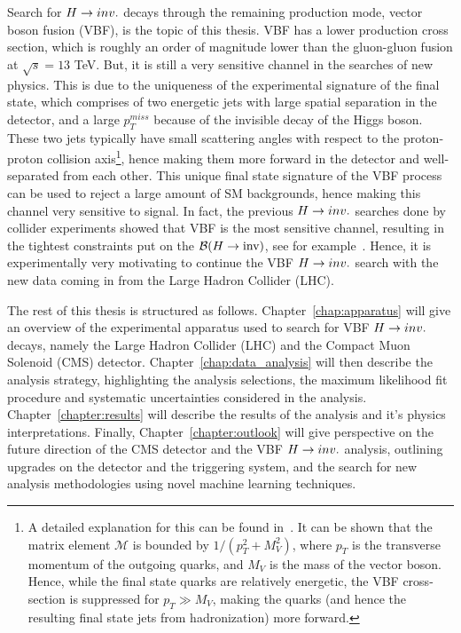 Search for $H \rightarrow inv.$ decays through the remaining production mode, vector boson fusion (VBF), is the topic of this thesis.
VBF has a lower production cross section, which is roughly an order of magnitude lower than the gluon-gluon fusion at $\sqrt{s} = 13$ TeV. But, it is still
a very sensitive channel in the searches of new physics. This is due to the uniqueness of the experimental signature of the final state, which comprises of two energetic jets with large
spatial separation in the detector, and a large $p_T^{miss}$ because of the invisible decay of the Higgs boson. These two jets typically have small scattering angles with respect to the proton-proton
collision axis\footnote{A detailed explanation for this can be found in~\cite{Djouadi:2005gi}. It can be shown that the matrix element $\mathcal{M}$ is bounded by $1 / (p_T^2 + M_V^2)$,
where $p_T$ is the transverse momentum of the outgoing quarks, and $M_V$ is the mass of the vector boson. Hence, while the final state quarks are relatively energetic, the VBF cross-section is
suppressed for $p_{T} \gg M_{V}$, making the quarks (and hence the resulting final state jets from hadronization) more forward.}, 
hence making them more forward in the detector and well-separated from each other. This unique final state signature of the VBF process can be used to reject a large amount of
SM backgrounds, hence making this channel very sensitive to signal. In fact, the previous $H \rightarrow inv.$ searches done by collider experiments showed that VBF is the most sensitive channel, resulting
in the tightest constraints put on the ${\mathcal{B}(H\rightarrow\text{inv})}$, see for example~\cite{CMS:2018yfx}. Hence, it is experimentally very motivating to continue the VBF $H \rightarrow inv.$ search with the new data coming in from
the Large Hadron Collider (LHC).

The rest of this thesis is structured as follows. Chapter~\ref{chap:apparatus} will give an overview of the experimental apparatus used to search for VBF $H \rightarrow inv.$ decays, namely the Large
Hadron Collider (LHC) and the Compact Muon Solenoid (CMS) detector. Chapter~\ref{chap:data_analysis} will then describe the analysis strategy, highlighting the analysis selections, the maximum
likelihood fit procedure and systematic uncertainties considered in the analysis. Chapter~\ref{chapter:results} will describe the results of the analysis and it's physics interpretations. Finally,
Chapter~\ref{chapter:outlook} will give perspective on the future direction of the CMS detector and the VBF $H \rightarrow inv.$ analysis, outlining upgrades on the detector and the triggering system, and
the search for new analysis methodologies using novel machine learning techniques.